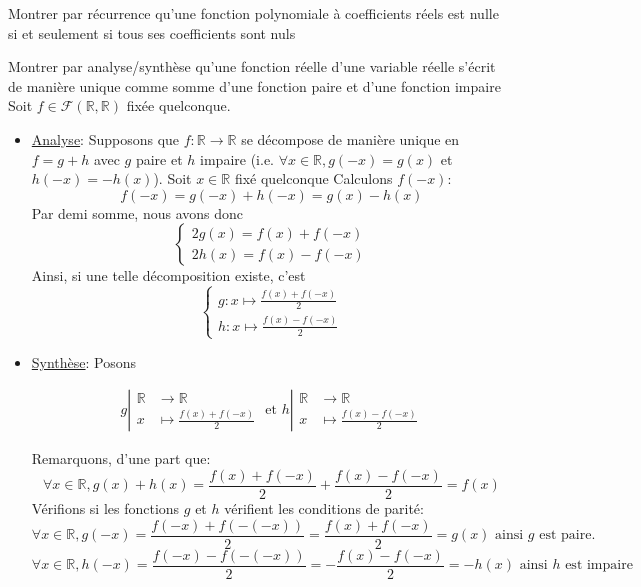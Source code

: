 \documentclass{article}
\begin{document}
\begin{question_kholle}{Montrer par récurrence qu'une fonction polynomiale à coefficients réels est nulle si et seulement si tous ses coefficients sont nuls}
    
\end{question_kholle}
\begin{question_kholle}{Montrer par analyse/synthèse qu'une fonction réelle d'une variable réelle s'écrit de manière unique comme somme d'une fonction paire et d'une fonction impaire}
    Soit $f \in \mathcal{F}(\mathbb{R}, \mathbb{R})$ fixée quelconque.
    \begin{itemize}
        
        
        \item \underline{Analyse}:
        Supposons que $f : \mathbb{R} \to \mathbb{R}$ se décompose de manière unique en $f = g+h$ avec $g$ paire et $h$ impaire (i.e. $\forall x \in \mathbb{R}, g(-x)= g(x)$ et $h(-x)= -h(x)$).
        Soit $x \in \mathbb{R}$ fixé quelconque
        Calculons $f(-x)$:
        $$f(-x) = g(-x) + h(-x) = g(x) -h(x)$$
        Par demi somme, nous avons donc
        $$
        \left\{ \begin{array}{ll}
            2g(x)  = f(x)+f(-x) \\
            2h(x) = f(x)-f(-x)
        \end{array}\right.
        $$
        Ainsi, si une telle décomposition existe, c'est
        $$
        \left\{ \begin{array}{ll}
            g : x \mapsto \frac{f(x)+f(-x)}{2}  \\
            h : x \mapsto \frac{f(x)-f(-x)}{2}
        \end{array}\right.
        $$
        
        \item \underline{Synthèse}:
        Posons
        
        \begin{align} 
            g\left|\begin{array}{ll} \mathbb{R} &\to \mathbb{R} \\ x &\mapsto \frac{f(x)+f(-x)}{2} \end{array}\right.
            \text{ et } h \left|\begin{array}{ll} \mathbb{R} &\to \mathbb{R} \\ x &\mapsto \frac{f(x)-f(-x)}{2} \end{array}\right.
        \end{align}
        
        
        Remarquons, d'une part que:
        $$
        \forall x \in \mathbb{R}, g(x)+h(x) = \frac{f(x)+f(-x)}{2} + \frac{f(x)-f(-x)}{2} = f(x)
        $$
        Vérifions si les fonctions $g$ et $h$ vérifient les conditions de parité:
        $$
        \forall x \in \mathbb{R}, g(-x) = \frac{f(-x)+f(-(-x))}{2}= \frac{f(x)+f(-x)}{2} = g(x) \text{ ainsi } g \text{ est paire.}
        $$
        $$
        \forall x \in \mathbb{R}, h(-x) = \frac{f(-x)-f(-(-x))}{2} = -\frac{f(x)-f(-x)}{2} = -h(x) \text{ ainsi } h \text{ est impaire}
        $$
    \end{itemize}
\end{question_kholle}
\end{document}
